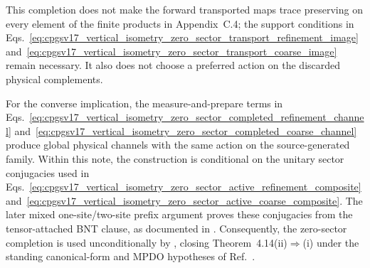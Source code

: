 \documentclass{article}
\begin{document}
This completion does not make the forward transported maps trace preserving on
every element of the finite products in Appendix~C.4; the support conditions
in
Eqs.~\ref{eq:cpgsv17_vertical_isometry_zero_sector_transport_refinement_image}
and~\ref{eq:cpgsv17_vertical_isometry_zero_sector_transport_coarse_image}
remain necessary. It also does not choose a preferred action on the discarded
physical complements.

For the converse implication, the measure-and-prepare terms in
Eqs.~\ref{eq:cpgsv17_vertical_isometry_zero_sector_completed_refinement_channel}
and~\ref{eq:cpgsv17_vertical_isometry_zero_sector_completed_coarse_channel}
produce global physical channels with the same action on the source-generated
family. Within this note, the construction is conditional on the unitary
sector conjugacies used in
Eqs.~\ref{eq:cpgsv17_vertical_isometry_zero_sector_active_refinement_composite}
and~\ref{eq:cpgsv17_vertical_isometry_zero_sector_active_coarse_composite}.
The later mixed one-site/two-site prefix argument proves these conjugacies from
the tensor-attached BNT clause, as documented in
. Consequently, the
zero-sector completion is used unconditionally by
, closing
Theorem~4.14(ii)$\Rightarrow$(i) under the standing canonical-form and MPDO
hypotheses of Ref.~\cite{Cirac2016MPDO_arXiv}.



\end{document}
